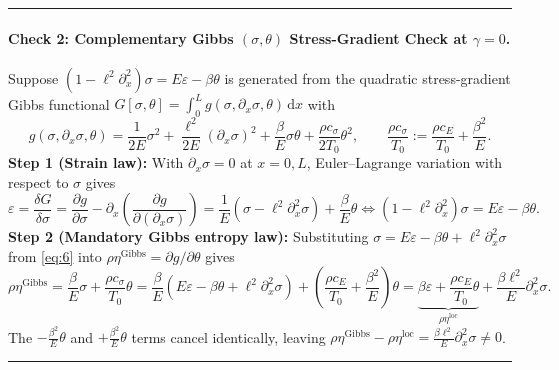 \documentclass[10pt,a4paper]{article}
\newcommand{\dd}{\,\mathrm{d}}
\begin{document}
\smallskip\noindent\rule{\textwidth}{0.4pt}

\paragraph{Check 2: Complementary Gibbs $(\sigma,\theta)$ Stress-Gradient Check at $\gamma = 0$.}
Suppose $(1 - \ell^2\partial_x^2)\sigma = E\varepsilon - \beta\theta$ is generated from the quadratic stress-gradient Gibbs functional $G[\sigma,\theta] = \int_0^L g(\sigma,\partial_x\sigma,\theta)\dd x$ with
\begin{equation}
  g(\sigma,\partial_x\sigma,\theta) = \frac{1}{2E}\sigma^2 + \frac{\ell^2}{2E}(\partial_x\sigma)^2 + \frac{\beta}{E}\sigma\theta + \frac{\rho c_\sigma}{2T_0}\theta^2, \qquad
  \frac{\rho c_\sigma}{T_0} := \frac{\rho c_E}{T_0} + \frac{\beta^2}{E}.\label{eq:5}
\end{equation}
\textbf{Step 1 (Strain law):} With $\partial_x\sigma = 0$ at $x = 0,L$, Euler--Lagrange variation with respect to $\sigma$ gives
\begin{equation}
  \varepsilon = \frac{\delta G}{\delta\sigma} = \frac{\partial g}{\partial\sigma} - \partial_x\!\left(\frac{\partial g}{\partial(\partial_x\sigma)}\right) = \frac{1}{E}(\sigma - \ell^2\partial_x^2\sigma) + \frac{\beta}{E}\theta \iff (1 - \ell^2\partial_x^2)\sigma = E\varepsilon - \beta\theta.\label{eq:6}
\end{equation}
\textbf{Step 2 (Mandatory Gibbs entropy law):} Substituting $\sigma = E\varepsilon - \beta\theta + \ell^2\partial_x^2\sigma$ from \eqref{eq:6} into $\rho\eta^{\mathrm{Gibbs}} = \partial g/\partial\theta$ gives
\begin{equation}
  \rho\eta^{\mathrm{Gibbs}} = \frac{\beta}{E}\sigma + \frac{\rho c_\sigma}{T_0}\theta = \frac{\beta}{E}\left(E\varepsilon - \beta\theta + \ell^2\partial_x^2\sigma\right) + \left(\frac{\rho c_E}{T_0} + \frac{\beta^2}{E}\right)\theta = \underbrace{\beta\varepsilon + \frac{\rho c_E}{T_0}\theta}_{\rho\eta^{\mathrm{loc}}} + \frac{\beta\ell^2}{E}\partial_x^2\sigma.\label{eq:7}
\end{equation}
The $-\frac{\beta^2}{E}\theta$ and $+\frac{\beta^2}{E}\theta$ terms cancel identically, leaving $\rho\eta^{\mathrm{Gibbs}} - \rho\eta^{\mathrm{loc}} = \frac{\beta\ell^2}{E}\partial_x^2\sigma \neq 0$.

\smallskip\noindent\rule{\textwidth}{0.4pt}
\end{document}
